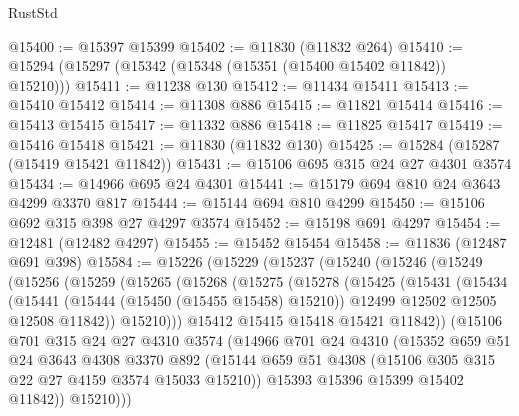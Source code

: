 \begin{lexlean}{RustStd}
\begin{coremodule}
@15400 := @15397 @15399
@15402 := @11830 (@11832 @264)
@15410 := @15294 (@15297 (@15342 (@15348 (@15351 (@15400 @15402 @11842)) @15210)))
@15411 := @11238 @130
@15412 := @11434 @15411
@15413 := @15410 @15412
@15414 := @11308 @886
@15415 := @11821 @15414
@15416 := @15413 @15415
@15417 := @11332 @886
@15418 := @11825 @15417
@15419 := @15416 @15418
@15421 := @11830 (@11832 @130)
@15425 := @15284 (@15287 (@15419 @15421 @11842))
@15431 := @15106 @695 @315 @24 @27 @4301 @3574
@15434 := @14966 @695 @24 @4301
@15441 := @15179 @694 @810 @24 @3643 @4299 @3370 @817
@15444 := @15144 @694 @810 @4299
@15450 := @15106 @692 @315 @398 @27 @4297 @3574
@15452 := @15198 @691 @4297
@15454 := @12481 (@12482 @4297)
@15455 := @15452 @15454
@15458 := @11836 (@12487 @691 @398)
@15584 := @15226
    (@15229
      (@15237
        (@15240
          (@15246
            (@15249
              (@15256
                (@15259
                  (@15265
                    (@15268
                      (@15275
                        (@15278
                          (@15425
                            (@15431
                              (@15434
                                (@15441
                                  (@15444 (@15450 (@15455 @15458) @15210))
                                  @12499
                                  @12502
                                  @12505
                                  @12508
                                  @11842))
                              @15210)))
                        @15412
                        @15415
                        @15418
                        @15421
                        @11842))
                    (@15106
                      @701
                      @315
                      @24
                      @27
                      @4310
                      @3574
                      (@14966
                        @701
                        @24
                        @4310
                        (@15352
                          @659
                          @51
                          @24
                          @3643
                          @4308
                          @3370
                          @892
                          (@15144
                            @659
                            @51
                            @4308
                            (@15106 @305 @315 @22 @27 @4159 @3574 @15033 @15210))
                          @15393
                          @15396
                          @15399
                          @15402
                          @11842))
                      @15210)))

\end{coremodule}
\end{lexlean}
